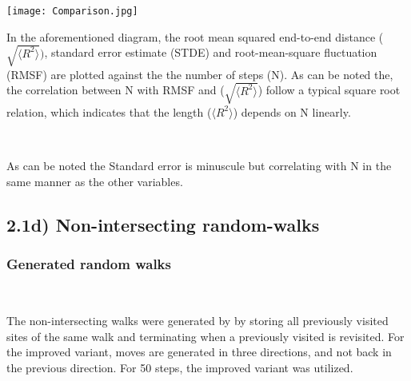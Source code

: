 \documentclass[12pt]{article}
\begin{document}
\begin{figure*}[ht!]
\begin{center}
    \texttt{[image: Comparison.jpg]}
 \caption{}
\end{center}
\end{figure*}

\noindent In the aforementioned diagram, the root mean squared end-to-end distance ($\sqrt{\langle R^2 \rangle})$, standard error estimate (STDE) and root-mean-square fluctuation (RMSF) are plotted against the the number of steps (N). As can be noted the, the correlation between N with RMSF and
($\sqrt{\langle R^2 \rangle}$) follow a typical square root relation, which indicates that the length ($\langle R^2 \rangle$) depends on N linearly.

\begin{figure*}[ht!]
\begin{center}
   \\
   \caption{\label{workflow} (a) Length dependence on N (b) Standard error}
\end{center}
\end{figure*}
\noindent As can be noted the Standard error is minuscule but correlating with N in the same manner as the other variables.

\newpage
\subsection*{2.1d) Non-intersecting random-walks}
\subsubsection*{Generated random walks}
\begin{figure*}[ht!]
\begin{center}
   \\
   \caption{\label{workflow} (a) 5 steps (b) 25 steps (c) 50 steps}
\end{center}
\end{figure*}

\noindent The non-intersecting walks were generated by 
by storing all previously visited sites of the same walk and terminating when a previously visited
is revisited. For the improved variant, moves are generated  in three directions, and not back in the previous direction. For 50 steps, the improved variant was utilized.
\end{document}
